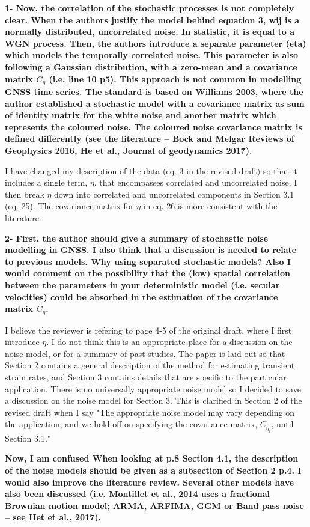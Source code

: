 \documentclass[10pt,a4paper]{letter}
\begin{document}
\begin{letter}{}
\textbf{1- Now, the correlation of the stochastic processes is not completely
clear. When the authors justify the model behind equation 3, wij is a
normally distributed, uncorrelated noise. In statistic, it is equal to
a WGN process. Then, the authors introduce a separate parameter (eta)
which models the temporally correlated noise. This parameter is also
following a Gaussian distribution, with a zero-mean and a covariance
matrix $C_{\eta}$ (i.e. line 10 p5). This approach is not common in
modelling GNSS time series. The standard is based on Williams 2003,
where the author established a stochastic model with a covariance
matrix as sum of identity matrix for the white noise and another
matrix which represents the coloured noise. The coloured noise
covariance matrix is defined differently (see the literature – Bock and
Melgar Reviews of Geophysics 2016, He et al., Journal of geodynamics
2017).}

I have changed my description of the data (eq. 3 in the revised draft)
so that it includes a single term, $\eta$, that encompasses correlated
and uncorrelated noise. I then break $\eta$ down into correlated and
uncorrelated components in Section 3.1 (eq. 25). The covariance matrix
for $\eta$ in eq. 26 is more consistent with the literature.

\textbf{2- First, the author should give a summary of stochastic noise
modelling in GNSS. I also think that a discussion is needed to relate
to previous models. Why using separated stochastic models? Also I
would comment on the possibility that the (low) spatial correlation
between the parameters in your deterministic model (i.e. secular
velocities) could be absorbed in the estimation of the covariance
matrix $C_{\eta}$.}

I believe the reviewer is refering to page 4-5 of the original draft,
where I first introduce $\eta$. I do not think this is an appropriate
place for a discussion on the noise model, or for a summary of past
studies. The paper is laid out so that Section 2 contains a general
description of the method for estimating transient strain rates, and
Section 3 contains details that are specific to the particular
application. There is no universally appropriate noise model so I
decided to save a discussion on the noise model for Section 3. This is
clarified in Section 2 of the revised draft when I say "The
appropriate noise model may vary depending on the application, and we
hold off on specifying the covariance matrix, $C_{\eta_i}$,
until Section 3.1."

\textbf{Now, I am confused When looking at p.8 Section 4.1, the
description of the noise models should be given as a subsection of
Section 2 p.4. I would also improve the literature review. Several
other models have also been discussed (i.e. Montillet et al., 2014
uses a fractional Brownian motion model; ARMA, ARFIMA, GGM or Band
pass noise – see Het et al., 2017).}


\end{letter}
\end{document}
